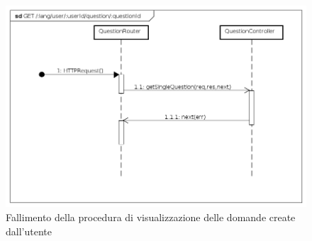 \begin{itemize}
\begin{figure}[ht]
	\centering
	\includegraphics[scale=0.45]{UML/DiagrammiDiSequenza/Back-end/GET__lang_user__userId_question__questionId_failure.png}
	\caption{Fallimento della procedura di visualizzazione delle domande create dall'utente}
\end{figure}
\FloatBarrier

\end{itemize}

